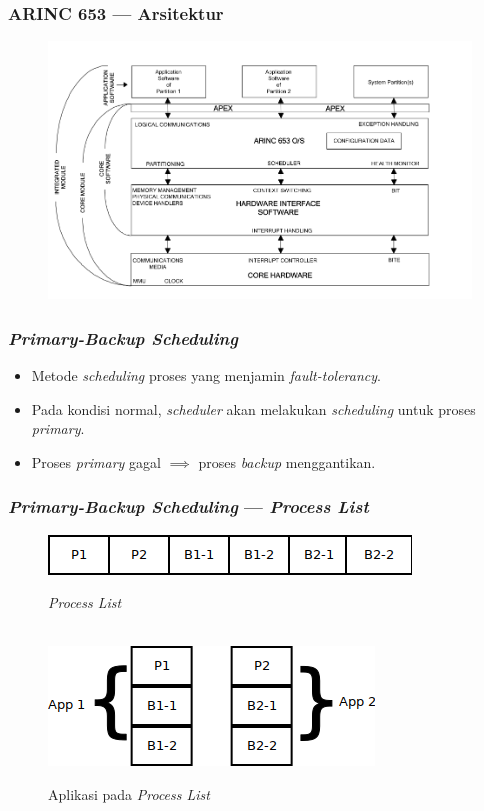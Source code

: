 \documentclass[xetex]{beamer}
\begin{document}
    \begin{frame}
        \frametitle{ARINC 653 --- Arsitektur}
        \begin{figure}[htbp]
            \centering
            \includegraphics[scale=0.3]{resources/arinc653-architecture.png}
        \end{figure}
    \end{frame}
    \begin{frame}
        \frametitle{\textit{Primary-Backup Scheduling}}
        \begin{itemize}
            \item Metode \textit{scheduling} proses yang menjamin \textit{fault-tolerancy}.
            \item Pada kondisi normal, \textit{scheduler} akan melakukan \textit{scheduling} untuk proses \textit{primary}.
            \item Proses \textit{primary} gagal $\implies$ proses \textit{backup} menggantikan.
        \end{itemize}
    \end{frame}
    \begin{frame}
        \frametitle{\textit{Primary-Backup Scheduling} --- \textit{Process List}}
        \begin{figure}[htbp]
            \includegraphics[scale=0.5]{resources/process_list.png}
            \caption*{\textit{Process List}}
            \\[25pt]
            \includegraphics[scale=0.5]{resources/process_list_desc.png}
            \caption*{Aplikasi pada \textit{Process List}}
        \end{figure}
    \end{frame}
\end{document}
